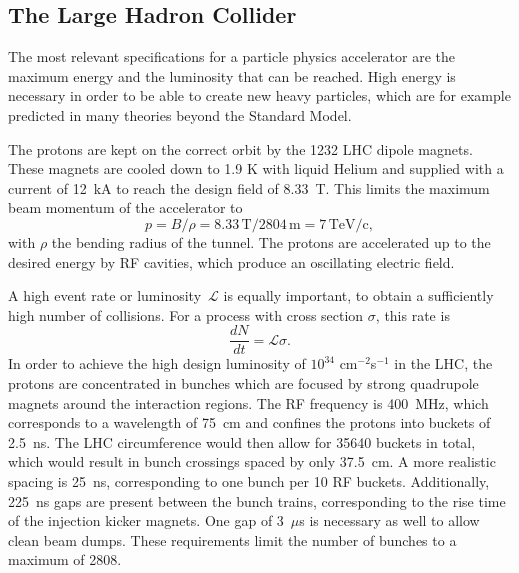 \subsection{The Large Hadron Collider}

The most relevant specifications for a particle physics accelerator are the maximum energy and the luminosity that can be reached. High energy is necessary in order to be able to create new heavy particles, which are for example predicted in many theories beyond the Standard Model.

The protons are kept on the correct orbit by the 1232 \ac{LHC} dipole magnets. These magnets are cooled down to 1.9 K with liquid Helium and supplied with a current of 12~kA to reach the design field of 8.33~T. This limits the maximum beam momentum of the accelerator to 
\begin{equation}
 p = B/\rho = 8.33\, \mathrm{T}/2804\,\mathrm{m}=7\,\mathrm{TeV/c},
\end{equation}
with $\rho$ the bending radius of the tunnel. The protons are accelerated up to the desired energy by \ac{RF} cavities, which produce an oscillating electric field. 

A high event rate or luminosity~$\mathcal{L}$ is equally important, to obtain a sufficiently high number of collisions. For a process with cross section $\sigma$, this rate is 
\begin{equation}
 \frac{dN}{dt} = \mathcal{L}\sigma .
\end{equation}
In order to achieve the high design luminosity of $10^{34}$ cm$^{-2}$s$^{-1}$ in the \ac{LHC}, the protons are concentrated in bunches which are focused by strong quadrupole magnets around the interaction regions. The RF frequency is 400~MHz, which corresponds to a wavelength of \SI{75}{cm} and confines the protons into buckets of \SI{2.5}{ns}. The \ac{LHC} circumference would then allow for 35640 buckets in total, which would result in bunch crossings spaced by only \SI{37.5}{cm}. A more realistic spacing is \SI{25}{ns}, corresponding to one bunch per 10 RF buckets. Additionally, \SI{225}{ns} gaps are present between the bunch trains, corresponding to the rise time of the injection kicker magnets. One gap of 3~$\mu$s is necessary as well to allow clean beam dumps. These requirements limit the number of bunches to a maximum of 2808.


